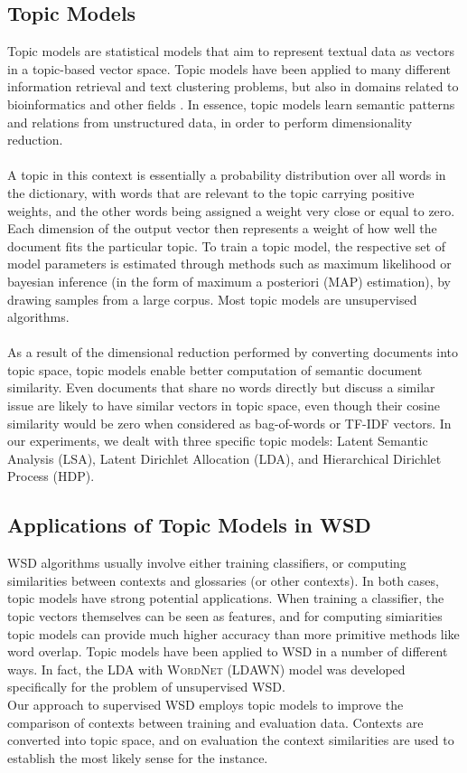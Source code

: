 \subsection{Topic Models}
Topic models are statistical models that aim to represent textual data as vectors in a topic-based vector space. Topic models have been applied to many different information retrieval and text clustering problems, but also in domains related to bioinformatics and other fields \cite{bioinformatics}. In essence, topic models learn semantic patterns and relations from unstructured data, in order to perform dimensionality reduction. \\\\
A topic in this context is essentially a probability distribution over all words in the dictionary, with words that are relevant to the topic carrying positive weights, and the other words being assigned a weight very close or equal to zero. Each dimension of the output vector then represents a weight of how well the document fits the particular topic. To train a topic model, the respective set of model parameters is estimated through methods such as maximum likelihood or bayesian inference (in the form of maximum a posteriori (MAP) estimation), by drawing samples from a large corpus. Most topic models are unsupervised algorithms.\\\\
As a result of the dimensional reduction performed by converting documents into topic space, topic models enable better computation of semantic document similarity. Even documents that share no words directly but discuss a similar issue are likely to have similar vectors in topic space, even though their cosine similarity would be zero when considered as bag-of-words or TF-IDF vectors. In our experiments, we dealt with three specific topic models: Latent Semantic Analysis (LSA), Latent Dirichlet Allocation (LDA), and Hierarchical Dirichlet Process (HDP)\cite{LSA_paper}\cite{LDA_paper}\cite{HDP_paper}.


\subsection{Applications of Topic Models in WSD}
WSD algorithms usually involve either training classifiers, or computing similarities between contexts and glossaries (or other contexts). In both cases, topic models have strong potential applications. When training a classifier, the topic vectors themselves can be seen as features, and for computing simiarities topic models can provide much higher accuracy than more primitive methods like word overlap. Topic models have been applied to WSD in a number of different ways\cite{topic_models_in_wsd}. In fact, the LDA with \textsc{WordNet} (LDAWN) model was developed specifically for the problem of unsupervised WSD\cite{LDAWN}. \\
Our approach to supervised WSD employs topic models to improve the comparison of contexts between training and evaluation data. Contexts are converted into topic space, and on evaluation the context similarities are used to establish the most likely sense for the instance.